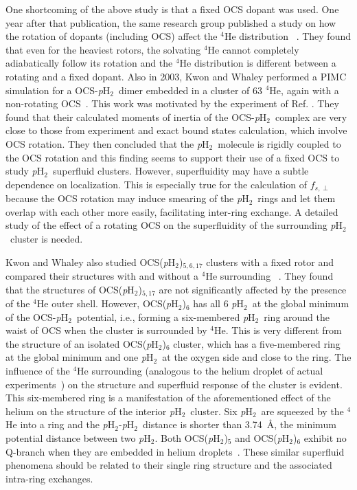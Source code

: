 \documentclass[12pt]{iopart}
\newcommand{\phtwo}{{\em p}H$_2$}
\begin{document}
One shortcoming of the above study is that a fixed OCS dopant was used. 
One year after that publication, the same research group published a study on how the rotation of dopants (including OCS) affect the $^4$He distribution ~\cite{patel_doprot_he}. 
They found that even for the heaviest rotors, the solvating $^4$He cannot completely adiabatically follow its rotation and the $^4$He distribution is different between a rotating and a fixed dopant. %
Also in 2003, Kwon and Whaley performed a PIMC simulation for a OCS-\phtwo~dimer embedded in a cluster of 63 $^4$He, again with a non-rotating OCS~\cite{kwon_h2-ocs_in_he63}. 
This work was motivated by the experiment of Ref. \cite{grebenev_OCS_pH2}.
They found that their calculated moments of inertia of the OCS-\phtwo~complex are very close to those from experiment and exact bound states calculation, which involve OCS rotation. 
They then concluded that the \phtwo~molecule is rigidly coupled to the OCS rotation and this finding seems to support their use of a fixed OCS to study \phtwo~superfluid clusters. 
However, superfluidity may have a subtle dependence on localization. 
This is especially true for the calculation of $f_{s,\perp}$ because the OCS rotation may induce smearing of the \phtwo~rings and let them overlap with each other more easily, facilitating inter-ring exchange. 
A detailed study of the effect of a rotating OCS on the superfluidity of the surrounding \phtwo~cluster is needed.

Kwon and Whaley also studied OCS(\phtwo)$_{5,6,17}$ clusters with a fixed rotor and compared their structures with and without a $^4$He surrounding ~\cite{kwon_ocs_6ph2_39he}. 
They found that the structures of OCS(\phtwo)$_{5,17}$ are not significantly affected by the presence of the $^4$He outer shell. 
However, OCS(\phtwo)$_{6}$ has all 6 \phtwo~at the global minimum of the OCS-\phtwo~potential, i.e., forming a six-membered \phtwo~ring around the waist of OCS when the cluster is surrounded by  $^4$He. 
This is very different from the structure of an isolated OCS(\phtwo)$_{6}$ cluster, which has a five-membered ring at the global minimum and one \phtwo~at the oxygen side and close to the ring. 
The influence of the $^4$He surrounding (analogous to the helium droplet of actual experiments~\cite{grebenev_pH2_5ring,vilesov_ocs_ph2_he}) on the structure and superfluid response of the cluster is evident. 
This six-membered ring is a manifestation of the aforementioned effect of the helium on the structure of the interior \phtwo~cluster\cite{gordillo_4He/H2}. 
Six \phtwo~are squeezed by the $^4$He into a ring and the \phtwo-\phtwo~distance is shorter than 3.74~\AA, the minimum potential distance between two \phtwo. 
Both OCS(\phtwo)$_{5}$ and OCS(\phtwo)$_{6}$ exhibit no Q-branch when they are embedded in helium droplets~\cite{grebenev_pH2_5ring}. These similar superfluid phenomena should be related to their single ring structure and the associated intra-ring exchanges.
\end{document}
